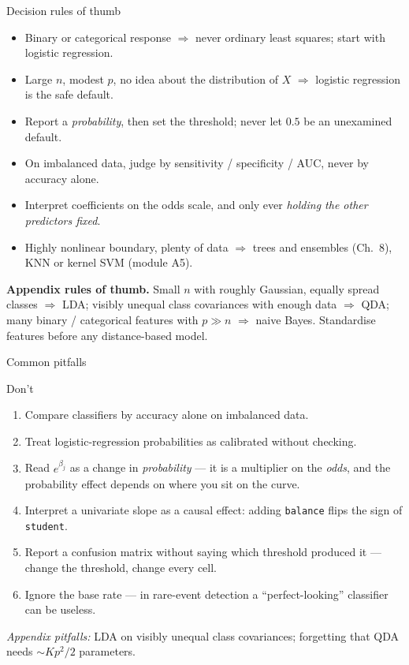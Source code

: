 \documentclass[aspectratio=169,11pt]{beamer}
\begin{document}
\begin{frame}{Decision rules of thumb}
  \begin{itemize}
    \item Binary or categorical response $\Rightarrow$ never ordinary least
          squares; start with logistic regression.
    \item Large $n$, modest $p$, no idea about the distribution of $X$
          $\Rightarrow$ logistic regression is the safe default.
    \item Report a \emph{probability}, then set the threshold; never let
          $0.5$ be an unexamined default.
    \item On imbalanced data, judge by sensitivity / specificity / AUC,
          never by accuracy alone.
    \item Interpret coefficients on the odds scale, and only ever
          \emph{holding the other predictors fixed}.
    \item Highly nonlinear boundary, plenty of data $\Rightarrow$ trees and
          ensembles (Ch.~8), KNN or kernel SVM (module A5).
  \end{itemize}
  \vspace{1mm}
  {\footnotesize \textbf{Appendix rules of thumb.} Small $n$ with roughly
  Gaussian, equally spread classes $\Rightarrow$ LDA; visibly unequal class
  covariances with enough data $\Rightarrow$ QDA; many binary / categorical
  features with $p\gg n$ $\Rightarrow$ naive Bayes. Standardise features
  before any distance-based model.}
\end{frame}

\begin{frame}{Common pitfalls}
  \begin{alertblock}{Don't}
    \begin{enumerate}
      \item Compare classifiers by accuracy alone on imbalanced data.
      \item Treat logistic-regression probabilities as calibrated
            without checking.
      \item Read $e^{\beta_j}$ as a change in \emph{probability} --- it is a
            multiplier on the \emph{odds}, and the probability effect
            depends on where you sit on the curve.
      \item Interpret a univariate slope as a causal effect: adding
            \texttt{balance} flips the sign of \texttt{student}.
      \item Report a confusion matrix without saying which threshold
            produced it --- change the threshold, change every cell.
      \item Ignore the base rate --- in rare-event detection a
            ``perfect-looking'' classifier can be useless.
    \end{enumerate}
  \end{alertblock}
  {\footnotesize \emph{Appendix pitfalls:} LDA on visibly unequal class
  covariances; forgetting that QDA needs $\sim K p^2/2$ parameters.}
\end{frame}
\end{document}
